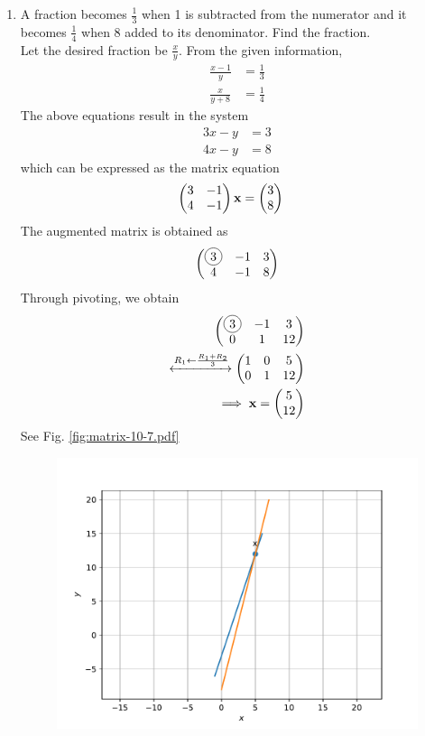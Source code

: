 \documentclass[journal,12pt,twocolumn]{IEEEtran}
\begin{document}
\begin{enumerate}
     \item A fraction becomes $\frac{1}{3}$ when 1 is subtracted from the numerator and it becomes $\frac{1}{4}$ when 8 added to its denominator. Find the fraction.\\
		\solution Let the desired fraction be $\frac{x}{y}$.  From the given information, 
		    \begin{align}
			    \frac{x-1}{y} &= \frac{1}{3}
			    \\
			    \frac{x}{y+8} &= \frac{1}{4}
		    \end{align}
		    The above equations result in the system 
		    \begin{align}
			    3x - y &= 3
			    \\
			    4x - y &= 8 
		    \end{align}
		    which can be expressed as the matrix equation 
		    \begin{align}
			    \begin{pmatrix}	    3 & -1  
			    \\
			    4 & -1\end{pmatrix} \mathbf{x} &= \begin{pmatrix}3\\8 \end{pmatrix}
		    \end{align}
		    The augmented matrix is obtained as 
		    \begin{align}
			    \myvec{	    \circled{3} & -1  &3
			    \\
			    4 & -1 & 8}  
		    \end{align}
		    Through pivoting, we obtain 
		    \begin{align}
			    \myvec{	    \circled{3} & -1  &3
			    \\
			    0 & 1 & 12}  
			    \\
			    \xleftrightarrow[]{R_1 \leftarrow \frac{R_1 + R_2}{3}}
			    \myvec{	    1 & 0  & 5
			    \\
			    0 & 1 & 12}  
			    \\
			    \implies \vec{x} = \myvec{5\\12}
		    \end{align}
    See Fig. 
	  \ref{fig:matrix-10-7.pdf}
  \begin{figure}
	  \centering 
	  \includegraphics[width=\columnwidth]{figs/matrix-10-7.pdf}

\end{figure}
\end{enumerate}
\end{document}

